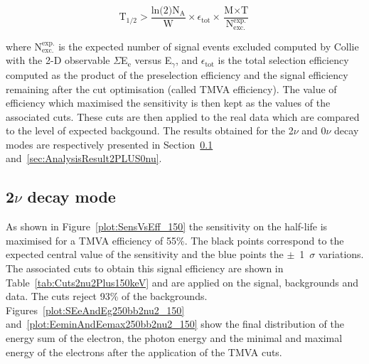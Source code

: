 \documentclass[main.tex]{subfiles}
\begin{document}
\begin{equation}\label{sec:SensitivityFormula}
\text{T}_{\text{1/2}} > \frac{\text{ln(2)} \text{N}_\text{A}}{\text{W}} \times \epsilon_{\text{tot}} \times \frac{\text{M} \times \text{T}}{\text{N}_{\text{exc.}}^{\text{exp.}}}
\end{equation}


\bigskip


\NI where $\text{N}_{\text{exc.}}^{\text{exp.}}$ is the expected number of signal events excluded computed by Collie with the 2-D observable $\Sigma$E$_\text{e}$ versus E$_{\gamma}$, and $\epsilon_{\text{tot}}$ is the total selection efficiency computed as the product of the preselection efficiency and the signal efficiency remaining after the cut optimisation (called TMVA efficiency). The value of efficiency which maximised the sensitivity is then kept as the values of the associated cuts. These cuts are then applied to the real data which are compared to the level of expected backgound. The results obtained for the 2$\nu$ and 0$\nu$ decay modes are respectively presented in Section~\ref{sec:AnalysisResult2PLUS2nu} and~\ref{sec:AnalysisResult2PLUS0nu}. 


\FloatBarrier


\subsection{2$\nu$ decay mode}\label{sec:AnalysisResult2PLUS2nu}


\NI As shown in Figure~\ref{plot:SensVsEff_150} the sensitivity on the half-life is maximised for a TMVA efficiency of 55\%.  The black points correspond to the expected central value of the sensitivity and the blue points the $\pm$~1~$\sigma$ variations. The associated cuts to obtain this signal efficiency are shown in Table~\ref{tab:Cuts2nu2Plus150keV} and are applied on the signal, backgrounds and data. The cuts reject 93\% of the backgrounds. Figures~\ref{plot:SEeAndEg250bb2nu2_150} and~\ref{plot:EeminAndEemax250bb2nu2_150} show the final distribution of the energy sum of the electron, the photon energy and the minimal and maximal energy of the electrons after the application of the TMVA cuts.
\end{document}
